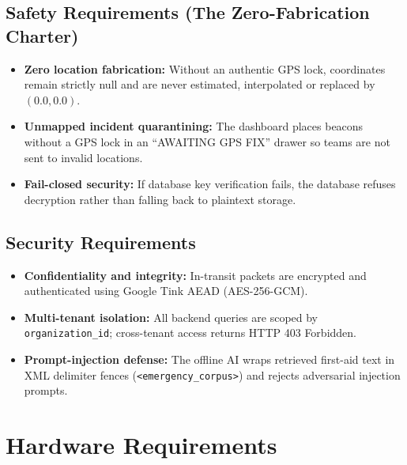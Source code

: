 \documentclass[12pt,a4paper]{report}
\begin{document}
\subsection{Safety Requirements (The Zero-Fabrication Charter)}
\begin{itemize}
    \item \textbf{Zero location fabrication:} Without an authentic GPS lock, coordinates remain strictly null and are never estimated, interpolated or replaced by $(0.0, 0.0)$.
    \item \textbf{Unmapped incident quarantining:} The dashboard places beacons without a GPS lock in an ``AWAITING GPS FIX'' drawer so teams are not sent to invalid locations.
    \item \textbf{Fail-closed security:} If database key verification fails, the database refuses decryption rather than falling back to plaintext storage.
\end{itemize}

\subsection{Security Requirements}
\begin{itemize}
    \item \textbf{Confidentiality and integrity:} In-transit packets are encrypted and authenticated using Google Tink AEAD (AES-256-GCM).
    \item \textbf{Multi-tenant isolation:} All backend queries are scoped by \texttt{organization\_id}; cross-tenant access returns HTTP 403 Forbidden.
    \item \textbf{Prompt-injection defense:} The offline AI wraps retrieved first-aid text in XML delimiter fences (\texttt{<emergency\_corpus>}) and rejects adversarial injection prompts.
\end{itemize}

\section{Hardware Requirements}
\end{document}
